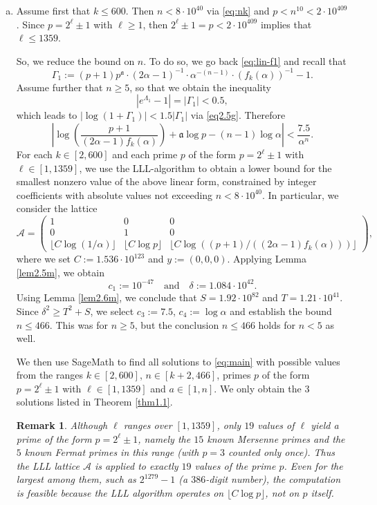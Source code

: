 \documentclass[11pt,a4paper]{article}
\newtheorem{remark}[theorem]{Remark}
\numberwithin{equation}{section}
\numberwithin{table}{section}
\numberwithin{figure}{section}
\begin{document}
\begin{enumerate}[(a)]
	\item Assume first that $k\le 600$. Then $n< 8\cdot 10^{40}$ via \eqref{eq:nk} and $p < n^{10}<2\cdot 10^{409}$. Since $p = 2^\ell \pm 1$ with $\ell \ge 1$, then $2^\ell \pm 1=p  < 2\cdot 10^{409}$ implies that $\ell \le 1359$.
	
	\medskip
	
	So, we reduce the bound on $n$. To do so, we go back \eqref{eq:lin-f1} and recall that
	\[
	\Gamma_1 := (p+1)p^\mathfrak{a}\cdot(2\alpha-1)^{-1}\cdot\alpha^{-(n-1)}\cdot(f_k(\alpha))^{-1}-1.
	\]
	Assume further that $n\ge 5$, so that we obtain the inequality  
	\[
	\left| e^{\Lambda_1} - 1 \right| = |\Gamma_1| < 0.5,
	\]
	which leads to $ |\log (1+\Gamma_1)| < 1.5|\Gamma_1|$ via \eqref{eq2.5g}. Therefore 
	\[
	\left|  \log \left(\dfrac{p+1}{(2\alpha-1)f_k(\alpha)}\right) + \mathfrak{a} \log p -(n-1) \log \alpha  \right| < \dfrac{7.5}{\alpha^{n}}.
	\]
	For each $k \in [2,600]$ and each prime $p$ of the form $p=2^\ell \pm 1$ with $\ell \in [1,1359]$, we use the LLL-algorithm to obtain a lower bound for the smallest nonzero value of the above linear form, constrained by integer coefficients with absolute values not exceeding $n < 8 \cdot 10^{40}$. In particular, we consider the lattice  
	\[
	\mathcal{A} = \begin{pmatrix} 
		1 & 0 & 0 \\ 
		0 & 1 & 0 \\ 
		\lfloor C\log (1/\alpha)\rfloor & \lfloor C\log p\rfloor & \lfloor C\log \left((p+1)/\left((2\alpha-1)f_k(\alpha) \right)\right) \rfloor
	\end{pmatrix},
	\]
	where we set $C := 1.536\cdot 10^{123}$ and $y := (0,0,0)$. Applying Lemma \ref{lem2.5m}, we obtain 
	\[
	c_1 := 10^{-47} \quad \text{and} \quad \delta := 1.084\cdot 10^{42}. 
	\]
	Using Lemma \ref{lem2.6m}, we conclude that $S =1.92 \cdot 10^{82}$ and $T = 1.21 \cdot 10^{41}$. Since $\delta^2 \geq T^2 + S$, we select $c_3 := 7.5$, $c_4 := \log \alpha$ and establish the bound $n \leq 466$.  This was for $n\ge 5$, but the conclusion $n\le 466$ holds for $n<5$ as well. 
	\medskip
	
	We then use SageMath to find all solutions to \eqref{eq:main} with possible values from the ranges $k\in[2,600]$, $n\in[k+2,466]$, primes $p$ of the form $p=2^\ell\pm 1$ with $\ell\in [1,1359]$ and $a\in[1,n]$. We only obtain the 3 solutions listed in Theorem \ref{thm1.1}.
	
	\medskip
	\begin{remark}
		Although $\ell$ ranges over $[1, 1359]$, only $19$ values of $\ell$ yield a prime of the form $p = 2^{\ell} \pm 1$, namely the $15$ known Mersenne primes and the $5$ known Fermat primes in this range (with $p = 3$ counted only once). Thus the LLL lattice $\mathcal{A}$ is applied to exactly $19$ values of the prime $p$. Even for the largest among them, such as $2^{1279} - 1$ (a $386$-digit number), the computation is feasible because the LLL algorithm operates on 
		$\lfloor C \log p \rfloor$, not on $p$ itself.
	\end{remark}


\end{enumerate}
\end{document}
